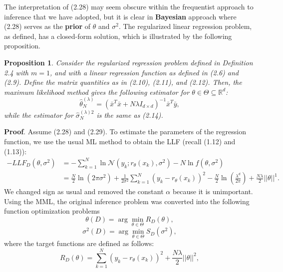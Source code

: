 \documentclass{report}
\newtheorem{proposition}{Proposition}[chapter]
\begin{document}
The interpretation of (2.28) may seem obscure within the frequentist approach to inference that we have adopted, but it is clear in \textbf{Bayesian} approach where (2.28) serves as the \textbf{prior} of $\theta$ and $\sigma^2$. The regularized linear regression problem, as defined, has a closed-form solution, which is illustrated by the following proposition.

\begin{proposition}
Consider the regularized regression problem defined in Definition 2.4 with $m=1$, and with a linear regression function as defined in (2.6) and (2.9). Define the matrix quantities as in (2.10), (2.11), and (2.12). Then, the maximum likelihood method gives the following estimator for $\theta \in \Theta \subseteq \mathbb{R}^d$:
\begin{equation}
\hat{\theta}_N^{(\lambda)} = (\bar{x}^T\bar{x} +N\lambda I_{d\times d})^{-1}\bar{x}^T\bar{y},
\end{equation}
while the estimator for $\hat{\sigma}_N^{(\lambda)2}$ is the same as (2.14).
\end{proposition}
\textbf{Proof}. Assume (2.28) and (2.29). To estimate the parameters of the regression function, we use the usual ML method to obtain the LLF (recall (1.12) and (1.13)):
\begin{equation}
\begin{split}
-LLF_{D}(\theta,\sigma^2)&=-\sum_{k=1}^N\ln\mathcal{N}(y_k;r_\theta(x_k),\sigma^2) - N\ln f(\theta,\sigma^2)\\
&=\frac{N}{2}\ln(2\pi\sigma^2)+\frac{1}{2\sigma^2}\sum_{k=1}^N(y_k-r_\theta(x_k))^2 -\frac{N}{2}\ln\left (\frac{\lambda^d}{2\pi}\right)+\frac{N\lambda}{2}||\theta||^1.
\end{split}
\end{equation}
We changed sign as usual and removed the constant $\alpha$ because it is unimportant. Using the MML, the original inference problem was converted into the following function optimization problems
\begin{equation}
 \theta(D) = \arg\min_{\theta \in \Theta} R_{D}(\theta),
\end{equation}
\begin{equation}
 \sigma^2(D) = \arg\min_{\theta \in \Theta} S_{D}(\sigma^2),
\end{equation}
where the target functions are defined as follows:
\begin{equation}
R_{D}(\theta) =\sum_{k=1}^N(y_k-r_\theta(x_k))^2 + \frac{N\lambda}{2}||\theta||^2,
\end{equation}
\end{document}
